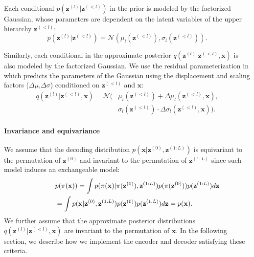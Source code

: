 \documentclass[final]{arxiv/cvpr}
\newcommand{\cutparagraphup}{\vspace*{-0.1in}}
\begin{document}
Each conditional $p(\mathbf{z}^{(l)}|\mathbf{z}^{(<l)})$ in the prior is modeled by the factorized Gaussian, whose parameters are dependent on the latent variables of the upper hierarchy $\mathbf{z}^{(<l)}$:
\begin{equation}
    p(\mathbf{z}^{(l)}|\mathbf{z}^{(<l)}) = \mathcal{N}\left(\mu_l(\mathbf{z}^{(<l)}), \sigma_l(\mathbf{z}^{(<l)})\right).
    \label{eqn:normal_prior}
\end{equation}

Similarly, each conditional in the approximate posterior $q(\mathbf{z}^{(l)}|\mathbf{z}^{(<l)}, \mathbf{x})$ is also modeled by the factorized Gaussian.
We use the residual parameterization in \cite{vahdat2020nvae} which predicts the parameters of the Gaussian using the displacement and scaling factors ($\Delta\mu$,$\Delta\sigma$) conditioned on $\mathbf{z}^{(<l)}$ and $\mathbf{x}$:
\begin{align}
    q(\mathbf{z}^{(l)}|\mathbf{z}^{(<l)}, \mathbf{x}) = \mathcal{N}(&\mu_l(\mathbf{z}^{(<l)}) + \Delta\mu_l(\mathbf{z}^{(<l)}, \mathbf{x}), \nonumber\\
    &\sigma_l(\mathbf{z}^{(<l)}) \cdot \Delta\sigma_l(\mathbf{z}^{(<l)}, \mathbf{x})).
    \label{eqn:normal_posterior}
\end{align}

\cutparagraphup
\paragraph{Invariance and equivariance}
We assume that the decoding distribution $p(\mathbf{x}|\mathbf{z}^{(0)}, \mathbf{z}^{(1:L)})$  is equivariant to the permutation of $\mathbf{z}^{(0)}$ and invariant to the permutation of $\mathbf{z}^{(1:L)}$ since such model induces an exchangeable model:
\begin{align}
    \lefteqn{p(\pi(\mathbf{x})) = \int p(\pi(\mathbf{x})|\pi(\mathbf{z}^{(0)}), \mathbf{z}^{(1:L)}) p(\pi(\mathbf{z}^{(0)})) p(\mathbf{z}^{(1:L)}) d\mathbf{z}}\nonumber\\
    &= \int p(\mathbf{x}|\mathbf{z}^{(0)},\mathbf{z}^{(1:L)}) p(\mathbf{z}^{(0)}) p(\mathbf{z}^{(1:L)}) d\mathbf{z} = p(\mathbf{x}).
\end{align}
We further assume that the approximate posterior distributions $q(\mathbf{z}^{(l)}|\mathbf{z}^{(<l)}, \mathbf{x})$ are invariant to the permutation of $\mathbf{x}$.
In the following section, we describe how we implement the encoder and decoder satisfying these criteria.
\end{document}
